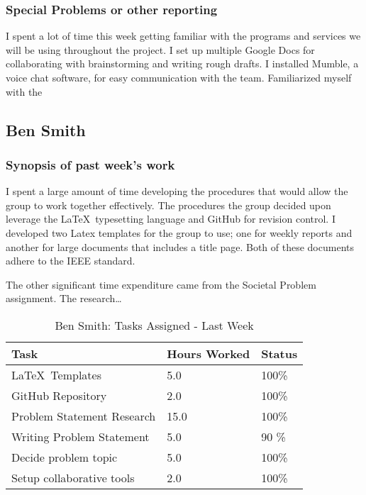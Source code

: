 \documentclass[12pt,article,compsoc]{IEEEtran}
\begin{document}
	\subsubsection*{Special Problems or other reporting}
	I spent a lot of time this week getting familiar with the programs and services we will be using throughout the project. I set up multiple Google Docs for collaborating with brainstorming and writing rough drafts. I installed Mumble, a voice chat software, for easy communication with the team. Familiarized myself with the
	\clearpage

\subsection{Ben Smith}

	\subsubsection*{Synopsis of past week's work}

	I spent a large amount of time developing the procedures that would allow the group to work together effectively. 
	The procedures the group decided upon leverage the \LaTeX\ typesetting language and GitHub for revision control.
	 I developed two Latex templates for the group to use; one for weekly reports and another for large documents that
	 includes a title page. Both of these documents adhere to the IEEE standard. 
	
	The other significant time expenditure came from the Societal Problem assignment. The research…

	\begin{table}[ht]
	\renewcommand{\arraystretch}{1.3}
		\caption{Ben Smith: Tasks Assigned - Last Week}
		
		\label{Summary of Ben Smith's activities: last week}
		
		\centering
		\begin{tabular}{p{5.5cm}|p{1cm}|p{1cm}}

		\hline
		\bfseries 		Task							& \bfseries Hours Worked		& \bfseries Status		\\
		\hline\hline
					\LaTeX\ Templates				& 5.0						& 100\%				\\	%
					GitHub Repository				& 2.0						& 100\%				\\	
					Problem Statement Research		& 15.0					& 100\%				\\
					Writing Problem Statement		& 5.0						& 90 \%				\\
					Decide problem topic			& 5.0						& 100\%				\\
					Setup collaborative tools			& 2.0						& 100\%				\\
		\hline
		\end{tabular}
	\end{table}
\end{document}
